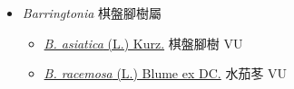 
  \begin{itemize}
 \item[] \textit{Barringtonia} 棋盤腳樹屬
                                
  \begin{itemize}
        \item[] \href{http://www.theplantlist.org/tpl1.1/search?q=Barringtonia+asiatica}{\textit{B. asiatica} (L.) Kurz.}   棋盤腳樹   VU
        \item[] \href{http://www.theplantlist.org/tpl1.1/search?q=Barringtonia+racemosa}{\textit{B. racemosa} (L.) Blume ex DC.}   水茄苳   VU
  \end{itemize}
  \end{itemize}
